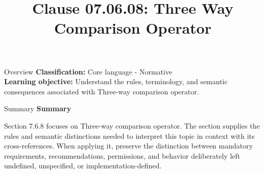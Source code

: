 \documentclass[10pt,letterpaper]{article}
\title{Clause 07.06.08: Three Way Comparison Operator}
\author{}
\date{}
\begin{document}
\maketitle
\begin{CornellOverviewBox}{Overview}
\textbf{Classification:} Core language - Normative\\[2pt]
\textbf{Learning objective:} Understand the rules, terminology, and semantic consequences associated with Three-way comparison operator.
\end{CornellOverviewBox}\begin{CornellSummaryBox}{Summary}
{\sffamily\bfseries\color{Accent} Summary}\par\vspace{3pt}Section 7.6.8 focuses on Three-way comparison operator. The section supplies the rules and semantic distinctions needed to interpret this topic in context with its cross-references. When applying it, preserve the distinction between mandatory requirements, recommendations, permissions, and behavior deliberately left undefined, unspecified, or implementation-defined.
\end{CornellSummaryBox}
\end{document}
